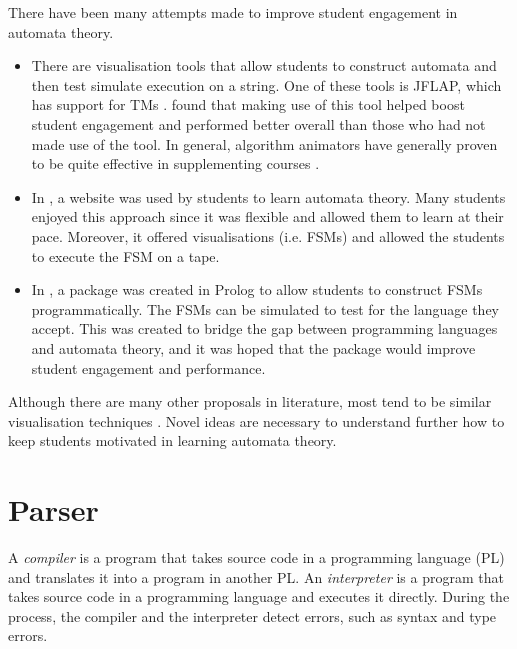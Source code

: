 There have been many attempts made to improve student engagement in automata theory. 
\begin{itemize}
    \item There are visualisation tools that allow students to construct automata and then test simulate execution on a string. One of these tools is JFLAP, which has support for TMs \citep{rodger2006jflap}. \citet{rodger2009increasing} found that making use of this tool helped boost student engagement and performed better overall than those who had not made use of the tool. In general, algorithm animators have generally proven to be quite effective in supplementing courses \citep{stasko1998empirically}.
    
    \item In \citet{tecson2018tutoring}, a website was used by students to learn automata theory. Many students enjoyed this approach since it was flexible and allowed them to learn at their pace. Moreover, it offered visualisations (i.e. FSMs) and allowed the students to execute the FSM on a tape.
    
    \item In \citet{wermelinger2005prolog}, a package was created in Prolog to allow students to construct FSMs programmatically. The FSMs can be simulated to test for the language they accept. This was created to bridge the gap between programming languages and automata theory, and it was hoped that the package would improve student engagement and performance.
\end{itemize} 

Although there are many other proposals in literature, most tend to be similar visualisation techniques \citep{zingaro2008another}. Novel ideas are necessary to understand further how to keep students motivated in learning automata theory. 

\section{Parser}
A \emph{compiler} is a program that takes source code in a programming language (PL) and translates it into a program in another PL. An \emph{interpreter} is a program that takes source code in a programming language and executes it directly. During the process, the compiler and the interpreter detect errors, such as syntax and type errors.

